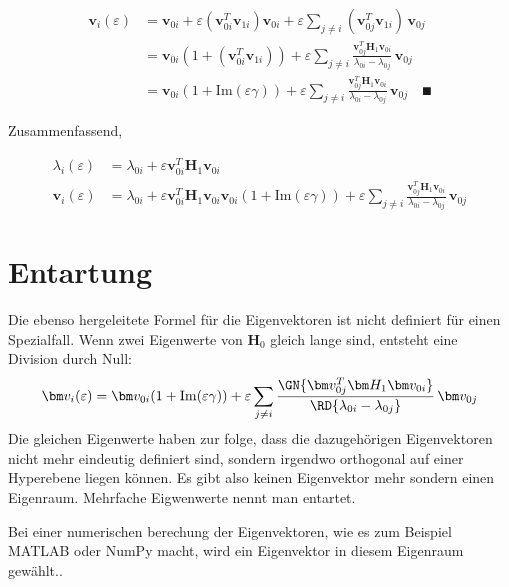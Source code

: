 \begin{align*}
    \bm v_i(\varepsilon)
    &=
    \bm v_{0i} + \varepsilon ( \bm v_{0i}^T \bm v_{1i}) \bm v_{0i} + \varepsilon \sum_{j \neq i} (\bm v_{0j}^T \bm v_{1i}) \, \bm v_{0j} \\
    &=
    \bm v_{0i} ( 1 + (\bm v_{0i}^T \bm v_{1i}) ) + \varepsilon \sum_{j \neq i}
    \frac{\bm v_{0j}^T \bm H_1 \bm v_{0i}}{\lambda_{0i} - \lambda_{0j}}
    \, \bm v_{0j} \\
    &=
    \bm v_{0i} ( 1 + \mathrm{Im}(\varepsilon \gamma) ) + \varepsilon \sum_{j \neq i}
    \frac{\bm v_{0j}^T \bm H_1 \bm v_{0i}}{\lambda_{0i} - \lambda_{0j}}
    \, \bm v_{0j}
    \quad
    \QED
\end{align*}


Zusammenfassend, 

\begin{align*}
    \lambda_i(\varepsilon)
    &=
    \lambda_{0i} + \varepsilon \bm v_{0i}^T \bm H_1 \bm v_{0i}\\
    \bm v_i(\varepsilon)
    &=
    \lambda_{0i} + \varepsilon \bm v_{0i}^T \bm H_1 \bm v_{0i}
    \bm v_{0i} ( 1 + \mathrm{Im}(\varepsilon \gamma) ) + \varepsilon \sum_{j \neq i}
    \frac{\bm v_{0j}^T \bm H_1 \bm v_{0i}}{\lambda_{0i} - \lambda_{0j}}
    \, \bm v_{0j}
\end{align*}


\section{Entartung}

Die ebenso hergeleitete Formel für die Eigenvektoren ist nicht definiert für einen Spezialfall.
Wenn zwei Eigenwerte von $\bm H_0$ gleich lange sind, entsteht eine Division durch Null:
\begin{equation*} %
    \bm v_i(\varepsilon)
    =
    \bm v_{0i} ( 1+ \mathrm{Im}(\varepsilon \gamma)) + \varepsilon \sum_{j \neq i}
    \frac{\GN{\bm v_{0j}^T \bm H_1 \bm v_{0i}}}{\RD{\lambda_{0i} - \lambda_{0j}}}
    \, \bm v_{0j}
\end{equation*}
Die gleichen Eigenwerte haben zur folge, dass die dazugehörigen Eigenvektoren nicht mehr eindeutig definiert sind, sondern irgendwo orthogonal auf einer Hyperebene liegen können.
Es gibt also keinen Eigenvektor mehr sondern einen Eigenraum.
Mehrfache Eigwenwerte nennt man entartet.


Bei einer numerischen berechung der Eigenvektoren, wie es zum Beispiel MATLAB oder NumPy macht, wird ein Eigenvektor in diesem Eigenraum gewählt..

